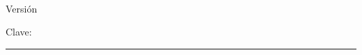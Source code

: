 \documentclass[11pt]{article}
\makeatletter
\newcommand{\myID}{\@ID}
\newcommand{\myDate}{\@Date}
\newcommand{\myTitulo}{\@Titulo}
\newcommand{\mySesion}{\ifx\@Sesion\@empty\else\ \textperiodcentered\ \@Sesion\fi}
\newcommand{\myClave}{\@Clave}
\makeatother
\begin{document}
{\sffamily
\textbf{\myTitulo}\mySesion\par
Versión \textbf{\myID} \textperiodcentered{} \myDate\par
\smallskip
Clave: \myClave\par
\medskip\hrule\medskip}

\begin{preguntas}


\end{preguntas}
\end{document}
